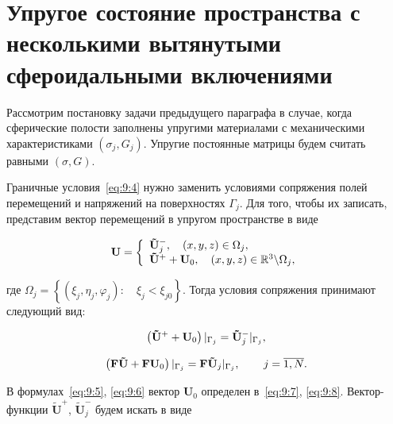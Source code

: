 \section{Упругое состояние пространства с несколькими вытянутыми сфероидальными включениями}


Рассмотрим постановку задачи предыдущего параграфа в случае, когда сферические полости заполнены упругими материалами с механическими характеристиками $(\sigma_j,G_j)$. Упругие постоянные матрицы будем считать равными $(\sigma,G)$.

Граничные условия~\eqref{eq:9:4} нужно заменить условиями сопряжения полей перемещений и напряжений на поверхностях $\Gamma_j$. Для того, чтобы их записать, представим вектор перемещений в упругом пространстве в виде

\begin{equation}
{\bf{U}} = \left\{ {\begin{array}{*{20}{l}}
{{\bf{\tilde U}}_j^ - ,\quad \left( {x,y,z} \right) \in {\Omega _j},}\\
{{{{\bf{\tilde U}}}^ + } + {{\bf{U}}_0},\quad \left( {x,y,z} \right) \in\mathbb{R}^3\backslash {\Omega _j},}
\end{array}} \right.
\label{eq:9:5}
\end{equation}

\noindent где ${\Omega _j} = \left\{ {\left( {{\xi _j},{\eta _j},{\varphi _j}} \right):\quad {\xi _j} < {\xi _{j0}}} \right\}$. Тогда условия сопряжения принимают следующий вид:

\begin{equation}
\left( {{{{\bf{\tilde U}}}^ + } + {{\bf{U}}_0}} \right){|_{{\Gamma _j}}} = {\bf{\tilde U}}_j^ - {|_{{\Gamma _j}}},
\label{eq:9:6}
\end{equation}

\begin{equation}
\left( {{\bf{F\tilde U}} + {\bf{F}}{{\bf{U}}_0}} \right){|_{{\Gamma _j}}} = {\bf{F}}{{\bf{\tilde U}}_j}{|_{{\Gamma _j}}},\qquad {\kern 1pt} j = \overline {1,N}.
\label{eq:9:9}
\end{equation}

В формулах~\eqref{eq:9:5}, \eqref{eq:9:6} вектор $\mathbf{U}_0$ определен в~\eqref{eq:9:7}, \eqref{eq:9:8}. Вектор-функции $\mathbf{\tilde U}^+$, $\mathbf{\tilde U}_j^-$ будем искать в виде

